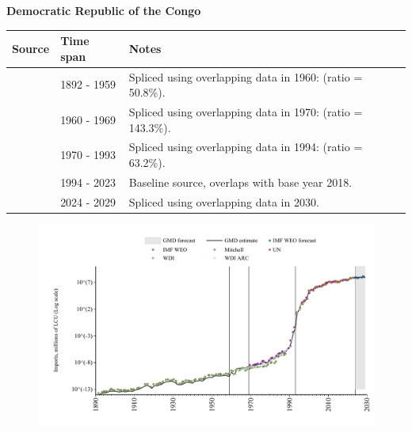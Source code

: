 \documentclass[12pt,a4paper,landscape]{article}
\begin{document}
\begin{adjustbox}{max totalsize={\paperwidth}{\paperheight},center}
\begin{minipage}[t][\textheight][t]{\textwidth}
\vspace*{0.5cm}
{}
\begin{center}
{\Large\bfseries Democratic Republic of the Congo}
\end{center}
\vspace{0.5cm}
\begin{table}[H]
\centering
\small
\begin{tabular}{|l|l|l|}
\hline
\textbf{Source} & \textbf{Time span} & \textbf{Notes} \\
\hline
\rowcolor{white}\cite{Mitchell}& 1892 - 1959 &Spliced using overlapping data in 1960: (ratio = 50.8\%).\\
\rowcolor{lightgray}\cite{WDI_ARC}& 1960 - 1969 &Spliced using overlapping data in 1970: (ratio = 143.3\%).\\
\rowcolor{white}\cite{UN}& 1970 - 1993 &Spliced using overlapping data in 1994: (ratio = 63.2\%).\\
\rowcolor{lightgray}\cite{WDI}& 1994 - 2023 &Baseline source, overlaps with base year 2018.\\
\rowcolor{white}\cite{IMF_WEO_forecast}& 2024 - 2029 &Spliced using overlapping data in 2030.\\
\hline
\end{tabular}
\end{table}
\begin{figure}[H]
\centering
\includegraphics[width=\textwidth,height=0.6\textheight,keepaspectratio]{graphs/COD_imports.pdf}
\end{figure}
\end{minipage}
\end{adjustbox}
\end{document}
